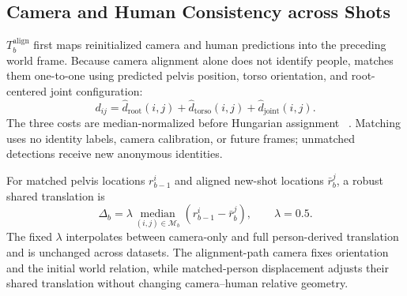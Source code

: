 \subsection{Camera and Human Consistency across Shots}

$T_b^{\mathrm{align}}$ first maps reinitialized camera and human predictions
into the preceding world frame. Because camera alignment alone does not identify
people, \method{} matches them one-to-one using predicted pelvis position,
torso orientation, and root-centered joint configuration:
\begin{equation}
 d_{ij}=\widehat d_{\mathrm{root}}(i,j)+
        \widehat d_{\mathrm{torso}}(i,j)+
        \widehat d_{\mathrm{joint}}(i,j).
 \label{eq:association-cost}
\end{equation}
The three costs are median-normalized before Hungarian assignment
~\citep{munkres1957assignment}. Matching uses no identity labels, camera
calibration, or future frames; unmatched detections receive new anonymous
identities.

For matched pelvis locations $r_{b-1}^i$ and aligned new-shot locations
$\bar r_b^j$, a robust shared translation is
\begin{equation}
 \Delta_b=\lambda\underset{(i,j)\in\mathcal M_b}{\operatorname{median}}
 (r_{b-1}^i-\bar r_b^j),\qquad \lambda=0.5.
 \label{eq:shared-translation}
\end{equation}
The fixed $\lambda$ interpolates between camera-only and full person-derived
translation and is unchanged across datasets. The alignment-path camera fixes
orientation and the initial world relation, while matched-person displacement
adjusts their shared translation without changing camera--human relative
geometry.

